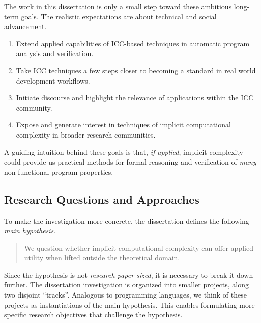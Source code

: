 The work in this dissertation is only a small step toward these ambitious long-term goals.
The realistic expectations are about technical and social advancement.
\begin{enumerate}
\item Extend {applied} capabilities of ICC-based techniques in automatic program analysis and verification.
\item Take ICC techniques a few steps closer to becoming a standard in real world development workflows.
\item Initiate discourse and highlight the relevance of applications within the ICC community.
\item Expose and generate interest in techniques of implicit computational complexity in broader research communities.
\end{enumerate}
A guiding intuition behind these goals is that, \emph{if applied}, implicit complexity could provide us practical methods for formal reasoning and verification of \emph{many} non-functional program properties.

\subsection{Research Questions and Approaches}
\label{subsec:research-goals}

To make the investigation more concrete, the dissertation defines the following \emph{main hypothesis}.
\begin{quotation}
\noindent We question whether implicit computational complexity can offer applied utility when lifted outside the theoretical domain.
\end{quotation}
Since the hypothesis is not \emph{research paper-sized}, it is necessary to break it down further.
The dissertation investigation is organized into smaller projects, along two disjoint \enquote{tracks}.
Analogous to programming languages, we think of these projects as instantiations of the main hypothesis.
This enables formulating more specific research objectives that challenge the hypothesis.

